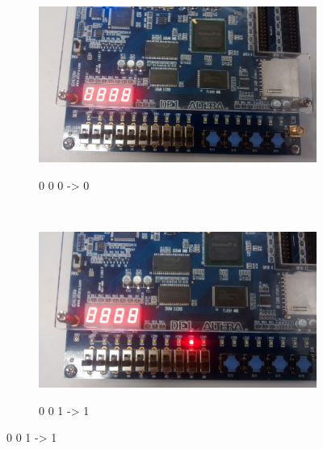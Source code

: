 	\begin{figure}
	    \centering

	    \begin{subfigure}[b]{0.44\textwidth}
	        \includegraphics[width=\textwidth]{img/cenario2/circ1}
	        \label{fig:circ1}
			\caption{0 0 0 -> 0}
	    \end{subfigure}
	    ~
	    \begin{subfigure}[b]{0.44\textwidth}
	        \includegraphics[width=\textwidth]{img/cenario2/circ2}
	        \label{fig:circ2}
			\caption{0 0 1 -> 1}
	    \end{subfigure}



\end{figure}
